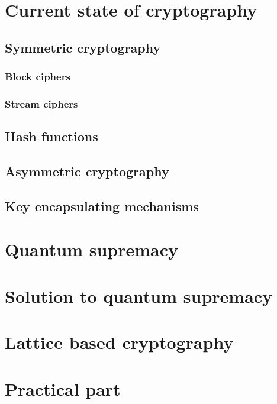 \chapter{Current state of cryptography}
\label{chapt:1}


\section{Symmetric cryptography}
\label{sec:1_1}


\subsection{Block ciphers}
\label{subsec:1_1_1}


\subsection{Stream ciphers}
\label{subsec:1_1_2}


\section{Hash functions}
\label{sec:1_2}


\section{Asymmetric cryptography}
\label{sec:1_3}


\section{Key encapsulating mechanisms}
\label{sec:1_4}


\chapter{Quantum supremacy}
\label{chapt:2}


\chapter{Solution to quantum supremacy}


\chapter{Lattice based cryptography}


\chapter{Practical part}
